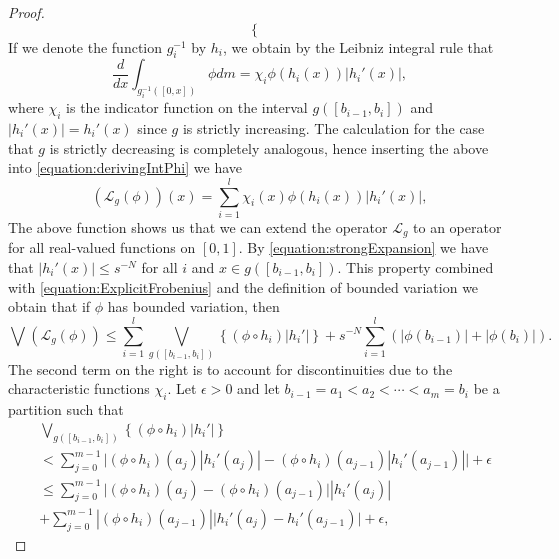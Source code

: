 \documentclass[pdftex,11pt,a4paper,oneside]{article}
\theoremstyle{plain}
\begin{document}
\begin{proof}
\[\begin{cases}
                                \end{cases}\]
If we denote the function $g_i^{-1}$ by $h_i$, we obtain by the Leibniz integral rule that 
\begin{equation}\label{equation:}
    \frac{d}{dx} \int_{g_i^{-1}([0,x])} \phi dm = \chi_i\phi(h_i(x))|h_i'(x)| ,
\end{equation}
where $\chi_i$ is the indicator function on the interval $g([b_{i-1},b_i])$ and $|h_i'(x)| = h_i'(x)$ since $g$ is strictly increasing. The calculation for the case that $g$ is strictly decreasing is completely analogous, hence inserting the above into \eqref{equation:derivingIntPhi} we have
\begin{equation}\label{equation:ExplicitFrobenius}
    \left(\mathcal{L}_g(\phi)\right)(x)= \sum_{i=1}^l \chi_i(x)\phi(h_i(x))|h_i'(x)| ,
\end{equation}
The above function shows us that we can extend the operator $\mathcal{L}_g$ to an operator for all real-valued functions on $[0,1]$. By \eqref{equation:strongExpansion} we have that $|h_i'(x)|\leq s^{-N}$ for all $i$ and $x\in g([b_{i-1},b_i])$. This property combined with \eqref{equation:ExplicitFrobenius} and the definition of bounded variation we obtain that if $\phi$ has bounded variation, then
\begin{equation}\label{eq:FirstStepInCalculatingTheVariation}
    \bigvee \left(\mathcal{L}_g(\phi)\right) \leq \sum_{i=1}^l\bigvee_{g([b_{i-1},b_i])}\left\{ (\phi\circ h_i)|h_i'|\right\}+s^{-N}\sum_{i=1}^l(|\phi(b_{i-1})|+|\phi(b_i)|).
\end{equation}
The second term on the right is to account for discontinuities due to the characteristic functions $\chi_i$. Let $\epsilon >0$ and let $b_{i-1}=a_1<a_2<\cdots<a_m = b_i$ be a partition such that 
\begin{equation}\label{eq:SplittingTheTotalVariation}
    \begin{split}
        &\bigvee_{g([b_{i-1},b_i])}\left\{ (\phi\circ h_i)|h_i'|\right\} \\
         &<\sum_{j=0}^{m-1} \Big|(\phi\circ h_i)(a_j)|h_i'(a_j)|-(\phi\circ h_i)(a_{j-1})|h_i'(a_{j-1})|\Big|+\epsilon\\
        &\leq\sum_{j=0}^{m-1} \Big|(\phi\circ h_i)(a_j)-(\phi\circ h_i)(a_{j-1}) \Big||h_i'(a_{j})|\\
        &+\sum_{j=0}^{m-1}|(\phi\circ h_i)(a_{j-1})|\Big| h_i'(a_{j}) -h_i'(a_{j-1})\Big|+\epsilon,
    \end{split}
\end{equation}


\end{proof}
\end{document}

